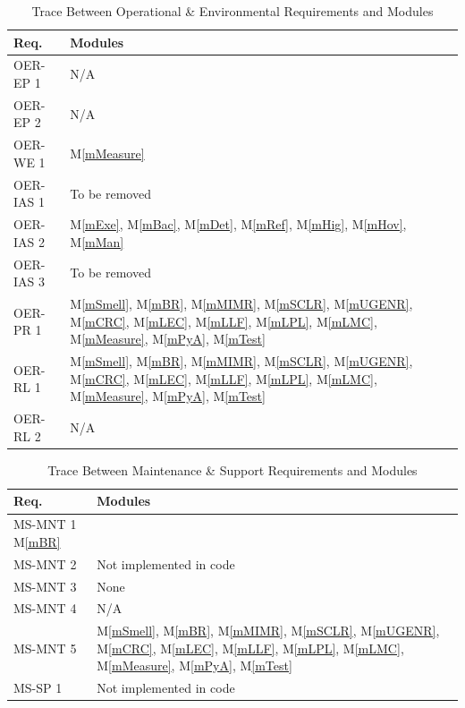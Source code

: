 \documentclass[12pt, titlepage]{article}
\newcommand{\mref}[1]{M\ref{#1}}
\begin{document}
\begin{table}[H]
  \centering
  \begin{tabular}{p{} p{}}
    \toprule \textbf{Req.} & \textbf{Modules}\\
    \midrule
    OER-EP 1 & N/A\\
    OER-EP 2 & N/A\\
    OER-WE 1 & \mref{mMeasure}\\
    OER-IAS 1 & To be removed\\
    OER-IAS 2 & \mref{mExe}, \mref{mBac}, \mref{mDet}, \mref{mRef}, \mref{mHig}, \mref{mHov}, \mref{mMan}\\
    OER-IAS 3 & To be removed\\
    OER-PR 1 & \mref{mSmell}, \mref{mBR}, \mref{mMIMR}, \mref{mSCLR}, \mref{mUGENR}, \mref{mCRC}, \mref{mLEC}, \mref{mLLF}, \mref{mLPL}, \mref{mLMC}, \mref{mMeasure}, \mref{mPyA}, \mref{mTest}\\
    OER-RL 1 & \mref{mSmell}, \mref{mBR}, \mref{mMIMR}, \mref{mSCLR}, \mref{mUGENR}, \mref{mCRC}, \mref{mLEC}, \mref{mLLF}, \mref{mLPL}, \mref{mLMC}, \mref{mMeasure}, \mref{mPyA}, \mref{mTest}\\
    OER-RL 2 & N/A\\
    \bottomrule
  \end{tabular}
  \caption{Trace Between Operational \& Environmental Requirements and Modules}
  \label{tab:OPE-mod}
\end{table}

\begin{table}[H]
  \centering
  \begin{tabular}{p{} p{}}
    \toprule \textbf{Req.} & \textbf{Modules}\\
    \midrule
    MS-MNT 1 \mref{mBR}\\
    MS-MNT 2 & Not implemented in code\\
    MS-MNT 3 & None \\
    MS-MNT 4 & N/A\\
    MS-MNT 5 & \mref{mSmell}, \mref{mBR}, \mref{mMIMR}, \mref{mSCLR}, \mref{mUGENR}, \mref{mCRC}, \mref{mLEC}, \mref{mLLF}, \mref{mLPL}, \mref{mLMC}, \mref{mMeasure}, \mref{mPyA}, \mref{mTest}\\
    MS-SP 1 & Not implemented in code\\
    \bottomrule
  \end{tabular}
  \caption{Trace Between Maintenance \& Support Requirements and Modules}
  \label{tab:MS-mod}
\end{table}
\end{document}
